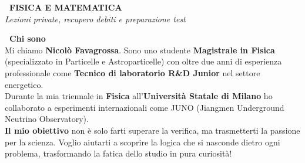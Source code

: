 \documentclass[a4paper,12pt]{article} %
\begin{document}
\begin{center}
    {\Huge \textbf{\faRocket\ FISICA E MATEMATICA}}\\[0.3cm]
    {\Large \textit{Lezioni private, recupero debiti e preparazione test}}
\end{center}
\vspace{0.4cm} 

\noindent
\begin{minipage}[t]{0.63\textwidth} %
    \vspace{0pt} %
    
    \textcolor{mainblue}{\Large \textbf{\faUserGraduate\ Chi sono}}\\[0.2cm]
    Mi chiamo \textbf{Nicolò Favagrossa}. Sono uno studente \textbf{Magistrale in Fisica} (specializzato in Particelle e Astroparticelle) con oltre due anni di esperienza professionale come \textbf{Tecnico di laboratorio R\&D Junior} nel settore energetico. \\
    Durante la mia triennale in \textbf{Fisica} all'\textbf{Università Statale di Milano} ho collaborato a esperimenti internazionali come JUNO (Jiangmen Underground Neutrino Observatory). \\
    \textbf{Il mio obiettivo} non è solo farti superare la verifica, ma trasmetterti la passione per la scienza. Voglio aiutarti a scoprire la logica che si nasconde dietro ogni problema, trasformando la fatica dello studio in pura curiosità!\\[0.4cm]
    

\end{minipage}
\end{document}
